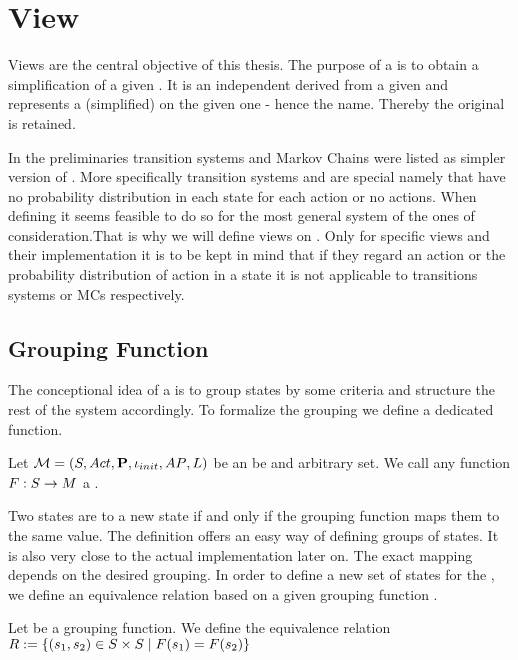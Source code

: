 \documentclass[preview]{standalone}
\begin{document}
\section{View}
Views are the central objective of this thesis. The purpose of a \viewN is to obtain a simplification of a given \chosengraphtypeN.  It is an independent \chosengraphtypeN derived from a given \chosengraphtypeN and represents a (simplified) \viewN on the given one - hence the name. Thereby the original \chosengraphtypeN is retained.

In the preliminaries transition systems and Markov Chains were listed as simpler version of \mdpsN. More specifically transition systems and \mdpsN are special \mdpsN namely that have no probability distribution in each state for each action or no actions. When defining \viewsN it seems feasible to do so for the most general system of the ones of consideration.That is why we will define views on \mdpsN. Only for specific views and their implementation it is to be kept in mind that if they regard an action or the probability distribution of action in a state it is not applicable to transitions systems or MCs respectively. 

\subsection{Grouping Function}
The conceptional idea of a \viewN is to group states by some criteria and structure the rest of the system accordingly. To formalize the grouping we define a dedicated function.

\begin{definition}
	Let ${{{\mathcal{M}}}} = {{({S}, {Act}, {\textbf{P}}, {\iota_{init}}, {AP}, {L})}}$ be \chosengraphtypeN an \arbset be and arbitrary set. We call any function $F : {S} \to {\ensuremath{{M}}}$ a \emph{\grpfctN}.
	
	\label{def:grpfct}
\end{definition}


Two states are  to a new state if and only if the grouping function maps them to the same value. The definition offers an easy way of defining groups of states. It is also very close to the actual implementation later on. The exact mapping depends on the desired grouping. In order to define a new set of states for the \viewN, we define an equivalence relation \eqrelview based on a given grouping function \grpfct.

\begin{definition}
	Let \grpfct be a grouping function. We define the equivalence relation ${R} :=\{ ({s}_1, {s}_2) \in {S} \times {S} \mid {F}({s}_1) = {F}({s}_2)\}$
	
	\label{def:eqrelview}
\end{definition}
\end{document}
